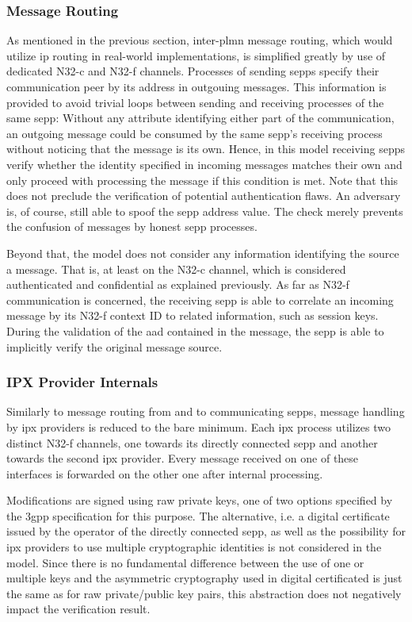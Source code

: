 \subsubsection{Message Routing}

As mentioned in the previous section, inter-\gls{plmn} message routing, which would utilize \gls{ip} routing in real-world implementations, is simplified greatly by use of dedicated N32-c and N32-f channels.
Processes of sending \glspl{sepp} specify their communication peer by its address in outgouing messages.
This information is provided to avoid trivial loops between sending and receiving processes of the same \gls{sepp}:
Without any attribute identifying either part of the communication, an outgoing message could be consumed by the same \gls{sepp}'s receiving process without noticing that the message is its own.
Hence, in this model receiving \glspl{sepp} verify whether the identity specified in incoming messages matches their own and only proceed with processing the message if this condition is met.
Note that this does not preclude the verification of potential authentication flaws.
An adversary is, of course, still able to spoof the \gls{sepp} address value.
The check merely prevents the confusion of messages by honest \gls{sepp} processes.

Beyond that, the model does not consider any information identifying the source a message.
That is, at least on the N32-c channel, which is considered authenticated and confidential as explained previously.
As far as N32-f communication is concerned, the receiving \gls{sepp} is able to correlate an incoming message by its N32-f context ID to related information, such as session keys.
During the validation of the \gls{aad} contained in the message, the \gls{sepp} is able to implicitly verify the original message source.

\subsubsection{IPX Provider Internals}

Similarly to message routing from and to communicating \glspl{sepp}, message handling by \gls{ipx} providers is reduced to the bare minimum.
Each \gls{ipx} process utilizes two distinct N32-f channels, one towards its directly connected \gls{sepp} and another towards the second \gls{ipx} provider.
Every message received on one of these interfaces is forwarded on the other one after internal processing.

Modifications are signed using raw private keys, one of two options specified by the \gls{3gpp} specification for this purpose.
The alternative, i.e. a digital certificate issued by the operator of the directly connected \gls{sepp}, as well as the possibility for \gls{ipx} providers to use multiple cryptographic identities is not considered in the model.
Since there is no fundamental difference between the use of one or multiple keys and the asymmetric cryptography used in digital certificated is just the same as for raw private/public key pairs, this abstraction does not negatively impact the verification result.

